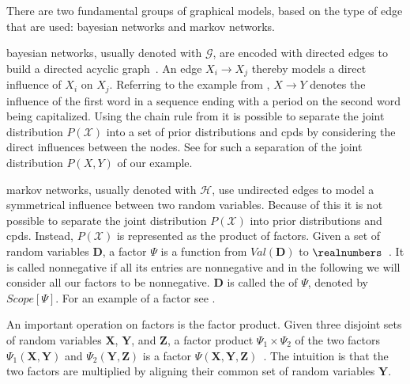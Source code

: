There are two fundamental groups of graphical models, based on the type of edge that are used: \glspl{bayesian network} and \glspl{markov network}.

\bigskip

\Glspl{bayesian network}, usually denoted with $\mathcal{G}$, are encoded with directed \glspl{edge} to build a directed acyclic graph~\citep{koller2009probabilistic}.
An \gls{edge} $X_i\to X_j$ thereby models a direct influence of $X_i$ on $X_j$.
Referring to the example from , $X\to Y$ denotes the influence of the first word in a sequence ending with a period on the second word being capitalized.
Using the chain rule from  it is possible to separate the \gls{joint distribution} $P(\mathcal{X})$ into a set of \glspl{prior distribution} and \glspl{cpd} by considering the direct influences between the \glspl{node}.
See  for such a separation of the \gls{joint distribution} $P(X,Y)$ of our example.

\bigskip

\Glspl{markov network}, usually denoted with $\mathcal{H}$, use undirected \glspl{edge} to model a symmetrical influence between two \glspl{random variable}.
Because of this it is not possible to separate the \gls{joint distribution} $P(\mathcal{X})$ into \glspl{prior distribution} and \glspl{cpd}.
Instead, $P(\mathcal{X})$ is represented as the product of \glspl{factor}.
Given a set of \glspl{random variable} $\bm{D}$, a \gls{factor} $\Psi$ is a function from $Val(\bm{D})$ to $\realnumbers$~\citep{koller2009probabilistic}.
It is called nonnegative if all its entries are nonnegative and in the following we will consider all our factors to be nonnegative.
$\bm{D}$ is called the  of $\Psi$, denoted by $Scope[\Psi]$.
For an example of a factor see .

An important operation on factors is the \gls{factor product}.
Given three disjoint sets of random variables $\bm{X}$, $\bm{Y}$, and $\bm{Z}$, a \gls{factor product} $\Psi_1\times \Psi_2$ of the two factors $\Psi_1(\bm{X},\bm{Y})$ and $\Psi_2(\bm{Y},\bm{Z})$ is a factor $\Psi(\bm{X},\bm{Y},\bm{Z})$~\citep{koller2009probabilistic}.
The intuition is that the two factors are multiplied by aligning their common set of \glspl{random variable} $\bm{Y}$.

